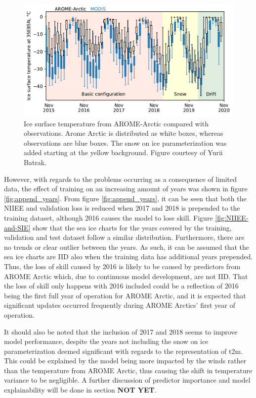 \documentclass[../main/thesis]{subfiles}
\begin{document}
\begin{figure}
    \centering
    \includegraphics[width=.9\textwidth]{aa-history}
    \caption{\label{fig:aa-history}Ice surface temperature from AROME-Arctic compared with observations. Arome Arctic is distributed as white boxes, whereas observations are blue boxes. The snow on ice parameterization was added starting at the yellow background. Figure courtesy of Yurii Batrak.}
\end{figure}

However, with regards to the problems occurring as a consequence of limited data, the effect of training on an increasing amount of years was shown in figure \ref{fig:append_years}. From figure \ref{fig:append_years}, it can be seen that both the NIIEE and validation loss is reduced when 2017 and 2018 is prepended to the training dataset, although 2016 causes the model to lose skill. Figure \ref{fig:NIIEE-and-SIE} show that the sea ice charts for the years covered by the training, validation and test dataset follow a similar distribution. Furthermore, there are no trends or clear outlier between the years. As such, it can be assumed that the sea ice charts are IID also when the training data has additional years prepended. Thus, the loss of skill caused by 2016 is likely to be caused by predictors from AROME Arctic which, due to continuous model development, are not IID. That the loss of skill only happens with 2016 included could be a reflection of 2016 being the first full year of operation for AROME Arctic, and it is expected that significant updates occurred frequently during AROME Arctics' first year of operation.

It should also be noted that the inclusion of 2017 and 2018 seems to improve model performance, despite the years not including the snow on ice parameterization deemed significant with regards to the representation of t2m. This could be explained by the model being more impacted by the winds rather than the temperature from AROME Arctic, thus causing the shift in temperature variance to be negligible. A further discussion of predictor importance and model explainability will be done in section \textbf{NOT YET}.
\end{document}
